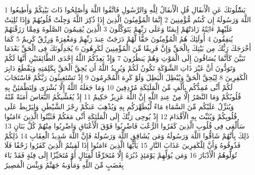 \documentclass[20pt,a4paper]{article}
\title{}
\author{}
\date{}
\begin{document}
\pagecolor{cl_page}



{\tiny\colorbox{cl_aya}{1}} يَسَْٔلُونَكَ عَنِ الْأَنفَالِ قُلِ الْأَنفَالُ لِلَّهِ وَالرَّسُولِ فَاتَّقُوا اللَّهَ وَأَصْلِحُوا ذَاتَ بَيْنِكُمْ وَأَطِيعُوا اللَّهَ وَرَسُولَهُ إِن كُنتُم مُّؤْمِنِينَ
{\tiny\colorbox{cl_aya}{2}} إِنَّمَا الْمُؤْمِنُونَ الَّذِينَ إِذَا ذُكِرَ اللَّهُ وَجِلَتْ قُلُوبُهُمْ وَإِذَا تُلِيَتْ عَلَيْهِمْ ءَايَتُهُ زَادَتْهُمْ إِيمَنًا وَعَلَى رَبِّهِمْ يَتَوَكَّلُونَ
{\tiny\colorbox{cl_aya}{3}} الَّذِينَ يُقِيمُونَ الصَّلَوةَ وَمِمَّا رَزَقْنَهُمْ يُنفِقُونَ
{\tiny\colorbox{cl_aya}{4}} أُولَئِكَ هُمُ الْمُؤْمِنُونَ حَقًّا لَّهُمْ دَرَجَتٌ عِندَ رَبِّهِمْ وَمَغْفِرَةٌ وَرِزْقٌ كَرِيمٌ
{\tiny\colorbox{cl_aya}{5}} كَمَا أَخْرَجَكَ رَبُّكَ مِن بَيْتِكَ بِالْحَقِّ وَإِنَّ فَرِيقًا مِّنَ الْمُؤْمِنِينَ لَكَرِهُونَ
{\tiny\colorbox{cl_aya}{6}} يُجَدِلُونَكَ فِى الْحَقِّ بَعْدَمَا تَبَيَّنَ كَأَنَّمَا يُسَاقُونَ إِلَى الْمَوْتِ وَهُمْ يَنظُرُونَ
{\tiny\colorbox{cl_aya}{7}} وَإِذْ يَعِدُكُمُ اللَّهُ إِحْدَى الطَّائِفَتَيْنِ أَنَّهَا لَكُمْ وَتَوَدُّونَ أَنَّ غَيْرَ ذَاتِ الشَّوْكَةِ تَكُونُ لَكُمْ وَيُرِيدُ اللَّهُ أَن يُحِقَّ الْحَقَّ بِكَلِمَتِهِ وَيَقْطَعَ دَابِرَ الْكَفِرِينَ
{\tiny\colorbox{cl_aya}{8}} لِيُحِقَّ الْحَقَّ وَيُبْطِلَ الْبَطِلَ وَلَوْ كَرِهَ الْمُجْرِمُونَ
{\tiny\colorbox{cl_aya}{9}} إِذْ تَسْتَغِيثُونَ رَبَّكُمْ فَاسْتَجَابَ لَكُمْ أَنِّى مُمِدُّكُم بِأَلْفٍ مِّنَ الْمَلَئِكَةِ مُرْدِفِينَ
{\tiny\colorbox{cl_aya}{10}} وَمَا جَعَلَهُ اللَّهُ إِلَّا بُشْرَى وَلِتَطْمَئِنَّ بِهِ قُلُوبُكُمْ وَمَا النَّصْرُ إِلَّا مِنْ عِندِ اللَّهِ إِنَّ اللَّهَ عَزِيزٌ حَكِيمٌ
{\tiny\colorbox{cl_aya}{11}} إِذْ يُغَشِّيكُمُ النُّعَاسَ أَمَنَةً مِّنْهُ وَيُنَزِّلُ عَلَيْكُم مِّنَ السَّمَاءِ مَاءً لِّيُطَهِّرَكُم بِهِ وَيُذْهِبَ عَنكُمْ رِجْزَ الشَّيْطَنِ وَلِيَرْبِطَ عَلَى قُلُوبِكُمْ وَيُثَبِّتَ بِهِ الْأَقْدَامَ
{\tiny\colorbox{cl_aya}{12}} إِذْ يُوحِى رَبُّكَ إِلَى الْمَلَئِكَةِ أَنِّى مَعَكُمْ فَثَبِّتُوا الَّذِينَ ءَامَنُوا سَأُلْقِى فِى قُلُوبِ الَّذِينَ كَفَرُوا الرُّعْبَ فَاضْرِبُوا فَوْقَ الْأَعْنَاقِ وَاضْرِبُوا مِنْهُمْ كُلَّ بَنَانٍ
{\tiny\colorbox{cl_aya}{13}} ذَلِكَ بِأَنَّهُمْ شَاقُّوا اللَّهَ وَرَسُولَهُ وَمَن يُشَاقِقِ اللَّهَ وَرَسُولَهُ فَإِنَّ اللَّهَ شَدِيدُ الْعِقَابِ
{\tiny\colorbox{cl_aya}{14}} ذَلِكُمْ فَذُوقُوهُ وَأَنَّ لِلْكَفِرِينَ عَذَابَ النَّارِ
{\tiny\colorbox{cl_aya}{15}} يَأَيُّهَا الَّذِينَ ءَامَنُوا إِذَا لَقِيتُمُ الَّذِينَ كَفَرُوا زَحْفًا فَلَا تُوَلُّوهُمُ الْأَدْبَارَ
{\tiny\colorbox{cl_aya}{16}} وَمَن يُوَلِّهِمْ يَوْمَئِذٍ دُبُرَهُ إِلَّا مُتَحَرِّفًا لِّقِتَالٍ أَوْ مُتَحَيِّزًا إِلَى فِئَةٍ فَقَدْ بَاءَ بِغَضَبٍ مِّنَ اللَّهِ وَمَأْوَىهُ جَهَنَّمُ وَبِئْسَ الْمَصِيرُ
\end{document}
